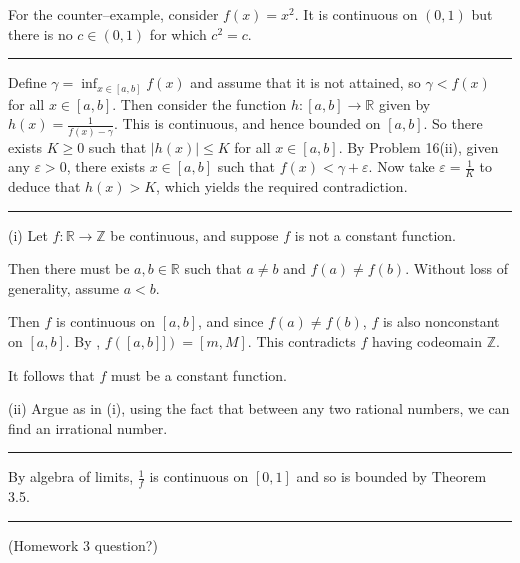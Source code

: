 \documentclass[letterpaper,10pt,english]{jupyterBook}
\begin{document}
For the counter–example, consider \(f(x) = x^2\). It is continuous on \((0, 1)\) but there is no \(c \in (0, 1)\) for which \(c^2 = c\).


\bigskip\hrule\bigskip


\sphinxAtStartPar
{\hyperref[\detokenize{Problems:id26}]{}} Define \(\gamma = \inf_{x \in [a, b]}f(x)\) and assume that it is not attained, so \(\gamma < f(x)\) for all \(x \in [a,b]\). Then consider the function \(h:[a,b]\to \mathbb{R}\) given by \(h(x) = \displaystyle\frac{1}{f(x) - \gamma}\). This is continuous, and hence bounded on \([a, b]\). So there exists \(K \geq 0\) such that \(|h(x)| \leq K\) for all \(x \in [a, b]\). By Problem 16(ii), given any \(\varepsilon > 0\), there exists \(x \in [a, b]\) such that \(f(x) < \gamma + \varepsilon\). Now take \(\varepsilon = \frac{1}{K}\) to deduce that \(h(x) > K\), which yields the required contradiction.


\bigskip\hrule\bigskip


\sphinxAtStartPar
{\hyperref[\detokenize{Problems:id27}]{}} (i) Let \(f:\mathbb{R}\to\mathbb{Z}\) be continuous, and suppose \(f\) is not a constant function.

\sphinxAtStartPar
Then there must be \(a,b\in\mathbb{R}\) such that \(a\neq b\) and \(f(a)\neq f(b)\). Without loss of generality, assume \(a<b\).

\sphinxAtStartPar
Then \(f\) is continuous on \([a,b]\), and since \(f(a)\neq f(b)\), \(f\) is also non\sphinxhyphen{}constant on \([a,b]\). By , \(f([a,b]])=[m,M]\). This contradicts \(f\) having codeomain \(\mathbb{Z}\).

\sphinxAtStartPar
It follows that \(f\) must be a constant function.

\sphinxAtStartPar
(ii) Argue as in (i), using the fact that between any two rational numbers, we can find an irrational number.


\bigskip\hrule\bigskip


\sphinxAtStartPar
{\hyperref[\detokenize{Problems:id28}]{}} By algebra of limits, \(\frac{1}{f}\) is continuous on \([0, 1]\) and so is bounded by Theorem 3.5.


\bigskip\hrule\bigskip


\sphinxAtStartPar
{\hyperref[\detokenize{Problems:id29}]{}} (Homework 3 question?)
\end{document}

